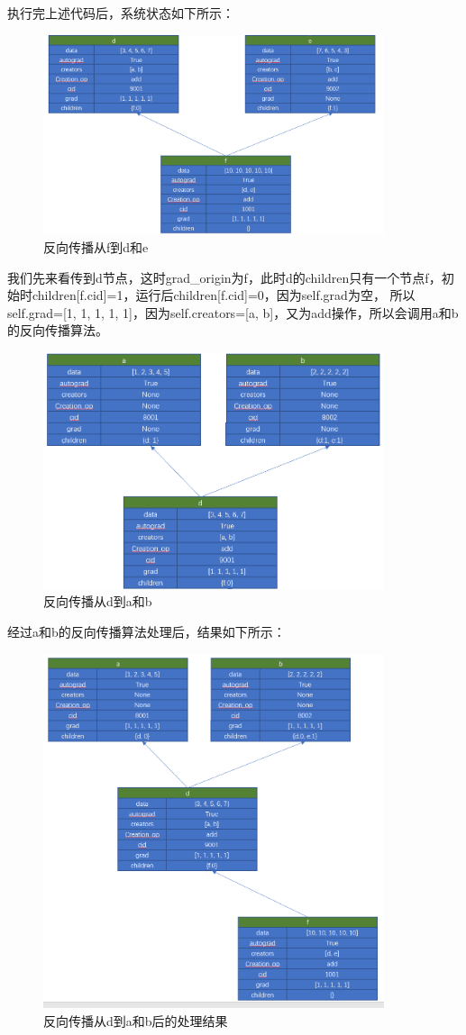 执行完上述代码后，系统状态如下所示：
\begin{figure}[h]
	\caption{反向传播从f到d和e}
	\label{p000018}
	\centering
	\includegraphics[width=10cm]{images/p000018}
\end{figure}
我们先来看传到d节点，这时grad\_origin为f，此时d的children只有一个节点f，初始时children[f.cid]=1，运行后children[f.cid]=0，因为self.grad为空，
所以self.grad=[1, 1, 1, 1, 1]，因为self.creators=[a, b]，又为add操作，所以会调用a和b的反向传播算法。
\begin{figure}[h]
	\caption{反向传播从d到a和b}
	\label{p000019}
	\centering
	\includegraphics[width=10cm]{images/p000019}
\end{figure}
经过a和b的反向传播算法处理后，结果如下所示：
\begin{figure}[h]
	\caption{反向传播从d到a和b后的处理结果}
	\label{p000020}
	\centering
	\includegraphics[width=10cm]{images/p000020}
\end{figure}
